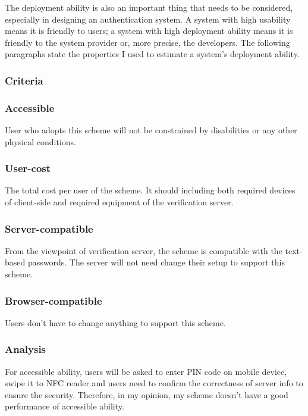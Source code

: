 \begin{CJK}{Bg5}{bsmi}
The deployment ability is also an important thing that needs to be considered, especially in designing an authentication system. A system with high usability means it is friendly to users; a system with high deployment ability means it is friendly to the system provider or, more precise, the developers. The following paragraphs state the properties I used to estimate a system's deployment ability.

\subsubsection{Criteria}

\subsubsection{Accessible}

User who adopts this scheme will not be constrained by disabilities or any other physical conditions.

\subsubsection{User-cost}

The total cost per user of the scheme. It should including both required devices of client-side and required equipment of the verification server.

\subsubsection{Server-compatible}

From the viewpoint of verification server, the scheme is compatible with the text-based passwords. The server will not need change their setup to support this scheme. 

\subsubsection{Browser-compatible}

Users don't have to change anything to support this scheme. 

\subsubsection{Analysis}

For accessible ability, users will be asked to enter PIN code on mobile device, swipe it to NFC reader and users need to confirm the correctness of server info to ensure the security. Therefore, in my opinion, my scheme doesn't have a good performance of accessible ability.


\end{CJK}
